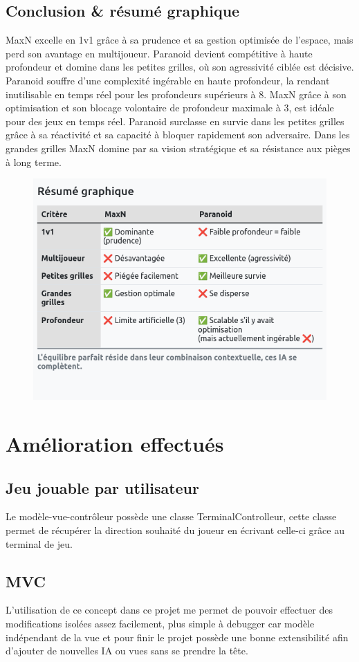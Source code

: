\documentclass[a4paper,12pt]{article}
\begin{document}
\subsection{Conclusion \& résumé graphique}
MaxN excelle en 1v1 grâce à sa prudence et sa gestion optimisée de l'espace, mais perd son avantage en multijoueur. Paranoid devient compétitive à haute profondeur et domine dans les petites grilles, où son agressivité ciblée est décisive.
Paranoid souffre d'une complexité ingérable en haute profondeur, la rendant inutilisable en temps réel pour les profondeurs supérieurs à 8. MaxN grâce à son optimisation et son blocage volontaire de profondeur maximale à 3, est idéale pour des jeux en temps réel.
Paranoid surclasse en survie dans les petites grilles grâce à sa réactivité et sa capacité à bloquer rapidement son adversaire. Dans les grandes grilles MaxN domine par sa vision stratégique et sa résistance aux pièges à long terme.

\begin{figure}[h!]
		\centering	\includegraphics[width=0.5\linewidth]{TableauResumeIA}
		\end{figure}
		
\newpage

\section{Amélioration effectués}

\subsection{Jeu jouable par utilisateur}
Le modèle-vue-contrôleur possède une classe TerminalControlleur, cette classe permet de récupérer la direction souhaité du joueur en écrivant celle-ci grâce au terminal de jeu.

\subsection{MVC}
L'utilisation de ce concept dans ce projet me permet de pouvoir effectuer des modifications isolées assez facilement, plus simple à debugger car modèle indépendant de la vue et pour finir le projet possède une bonne extensibilité afin d'ajouter de nouvelles IA ou vues sans se prendre la tête.
\end{document}
